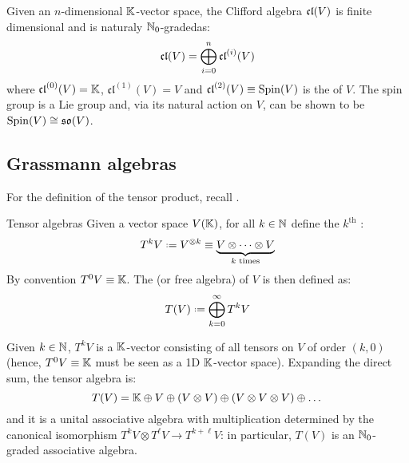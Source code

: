 Given an $ n $-dimensional $ \mathbb{K} $-vector space, the Clifford algebra $ \mathfrak{cl}(V) $ is finite dimensional and is naturaly $ \mathbb{N}_0 $-graded\footnotemark as:
\begin{equation}
  \mathfrak{cl}(V) = \bigoplus_{i = 0}^n \mathfrak{cl}^{(i)}(V)
  \label{eq:cliff-alg-grade}
\end{equation}
where $ \mathfrak{cl}^{(0)}(V) = \mathbb{K} $, $ \mathfrak{cl}^{(1)}(V) = V $ and $ \mathfrak{cl}^{(2)}(V) \equiv \operatorname{Spin}(V) $ is the  of $ V $. The spin group is a Lie group and, via its natural action on $ V $, can be shown to be $ \operatorname{Spin}(V) \cong \mathfrak{so}(V) $.
%

\subsection{Grassmann algebras}

For the definition of the tensor product, recall .

\begin{definition}{Tensor algebras}{}
  Given a vector space $ V(\mathbb{K}) $, for all $ k \in \mathbb{N} $ define the $ k^\text{th} $ :
  \begin{equation*}
    T^kV \defeq V^{\otimes k} \equiv \underbrace{V \otimes \dots \otimes V}_{k \text{ times}}
  \end{equation*}
  By convention $ T^0V \equiv \mathbb{K} $. The  (or free algebra) of $ V $ is then defined as:
  \begin{equation}
    T(V) \defeq \bigoplus_{k = 0}^\infty T^kV
  \end{equation}
\end{definition}

Given $ k \in \mathbb{N} $, $ T^kV $ is a $ \mathbb{K} $-vector consisting of all tensors on $ V $ of order $ (k,0) $ (hence, $ T^0V \equiv \mathbb{K} $ must be seen as a 1D $ \mathbb{K} $-vector space). Expanding the direct sum, the tensor algebra is:
\begin{equation}
  T(V) = \mathbb{K} \oplus V \oplus (V \otimes V) \oplus (V \otimes V \otimes V) \oplus \dots
\end{equation}
and it is a unital associative algebra with multiplication determined by the canonical isomorphism $ T^kV \otimes T^\ell V \rightarrow T^{k+\ell}V $: in particular, $ T(V) $ is an $ \mathbb{N}_0 $-graded associative algebra.

